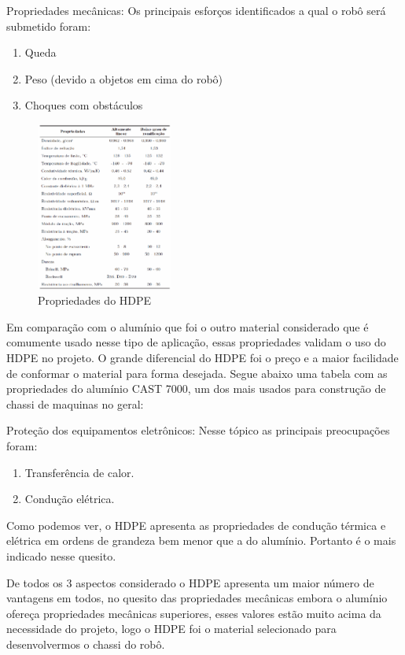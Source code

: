Propriedades mecânicas: Os principais esforços identificados a qual o robô será submetido foram:
\begin{enumerate}
\item Queda
\item Peso (devido a objetos em cima do robô)
\item Choques com obstáculos
\end{enumerate}

\begin{figure}[H]
    \centering
    \includegraphics[width=0.4\textwidth]{figuras/tabela_pead.eps}
    \caption{Propriedades do HDPE}
    \label{fig:catia01}
\end{figure}

Em comparação com o alumínio que foi o outro material considerado que é comumente usado nesse tipo de aplicação, essas propriedades validam o uso do HDPE no projeto. O grande diferencial do HDPE foi o preço e a maior facilidade de conformar o material para forma desejada. Segue abaixo uma tabela com as propriedades do alumínio CAST 7000, um dos mais usados para construção de chassi de maquinas no geral:

Proteção dos equipamentos eletrônicos: Nesse tópico as principais preocupações foram:
\begin{enumerate}
\item Transferência de calor.
\item Condução elétrica.
\end{enumerate}

Como podemos ver, o HDPE apresenta as propriedades de condução térmica e elétrica em ordens de grandeza bem menor que a do alumínio. Portanto é o mais indicado nesse quesito.

De todos os 3 aspectos considerado o HDPE apresenta um maior número de vantagens em todos, no quesito das propriedades mecânicas embora o alumínio ofereça propriedades mecânicas superiores, esses valores estão muito acima da necessidade do projeto, logo o HDPE foi o material selecionado para desenvolvermos o chassi do robô.
 
